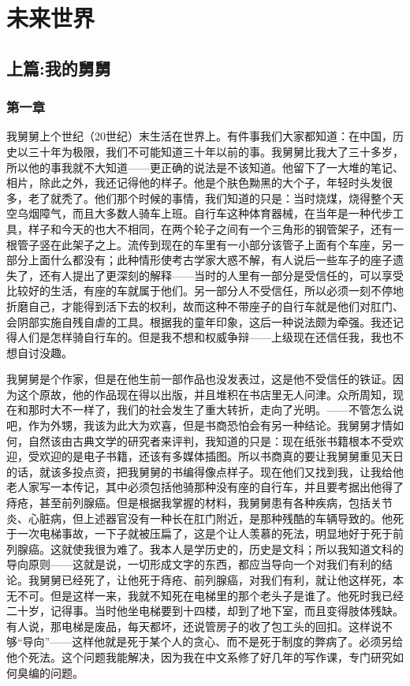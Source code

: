 \chapter{未来世界}

\section{上篇:我的舅舅}

\subsection{第一章}

我舅舅上个世纪（20世纪）末生活在世界上。有件事我们大家都知道：在中国，历史以三十年为极限，我们不可能知道三十年以前的事。我舅舅比我大了三十多岁，所以他的事我就不大知道——更正确的说法是不该知道。他留下了一大堆的笔记、相片，除此之外，我还记得他的样子。他是个肤色黝黑的大个子，年轻时头发很多，老了就秃了。他们那个时候的事情，我们知道的只是：当时烧煤，烧得整个天空乌烟障气，而且大多数人骑车上班。自行车这种体育器械，在当年是一种代步工具，样子和今天的也大不相同，在两个轮子之间有一个三角形的钢管架子，还有一根管子竖在此架子之上。流传到现在的车里有一小部分该管子上面有个车座，另一部分上面什么都没有；此种情形使考古学家大惑不解，有人说后一些车子的座子遗失了，还有人提出了更深刻的解释——当时的人里有一部分是受信任的，可以享受比较好的生活，有座的车就属于他们。另一部分人不受信任，所以必须一刻不停地折磨自己，才能得到活下去的权利，故而这种不带座子的自行车就是他们对肛门、会阴部实施自残自虐的工具。根据我的童年印象，这后一种说法颇为牵强。我还记得人们是怎样骑自行车的。但是我不想和权威争辩——上级现在还信任我，我也不想自讨没趣。 

我舅舅是个作家，但是在他生前一部作品也没发表过，这是他不受信任的铁证。因为这个原故，他的作品现在得以出版，并且堆积在书店里无人问津。众所周知，现在和那时大不一样了，我们的社会发生了重大转折，走向了光明。——不管怎么说吧，作为外甥，我该为此大为欢喜，但是书商恐怕会有另一种结论。我舅舅才情如何，自然该由古典文学的研究者来评判，我知道的只是：现在纸张书籍根本不受欢迎，受欢迎的是电子书籍，还该有多媒体插图。所以书商真的要让我舅舅重见天日的话，就该多投点资，把我舅舅的书编得像点样子。现在他们又找到我，让我给他老人家写一本传记，其中必须包括他骑那种没有座的自行车，并且要考据出他得了痔疮，甚至前列腺癌。但是根据我掌握的材料，我舅舅患有各种疾病，包括关节炎、心脏病，但上述器官没有一种长在肛门附近，是那种残酷的车辆导致的。他死于一次电梯事故，一下子就被压扁了，这是个让人羡慕的死法，明显地好于死于前列腺癌。这就使我很为难了。我本人是学历史的，历史是文科；所以我知道文科的导向原则——这就是说，一切形成文字的东西，都应当导向一个对我们有利的结论。我舅舅已经死了，让他死于痔疮、前列腺癌，对我们有利，就让他这样死，本无不可。但是这样一来，我就不知死在电梯里的那个老头子是谁了。他死时我已经二十岁，记得事。当时他坐电梯要到十四楼，却到了地下室，而且变得肢体残缺。有人说，那电梯是废品，每天都坏，还说管房子的收了包工头的回扣。这样说不够“导向”——这样他就是死于某个人的贪心、而不是死于制度的弊病了。必须另给他个死法。这个问题我能解决，因为我在中文系修了好几年的写作课，专门研究如何臭编的问题。 

